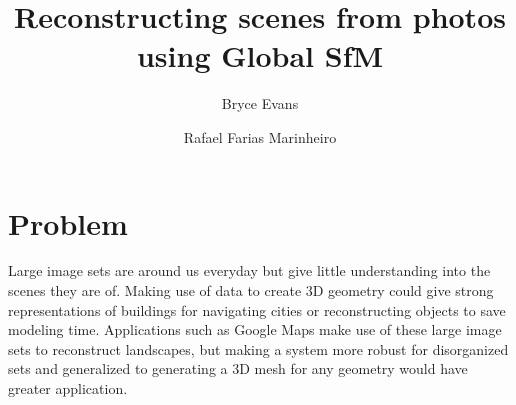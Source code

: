 \documentclass[conference, 12pt]{acmsiggraph}
\title{Reconstructing scenes from photos using Global SfM}
\author{Bryce Evans \and Rafael Farias Marinheiro}
\affiliation{Cornell University\thanks{\{bae43, rf356\}@cornell.edu}}
\begin{document}

\maketitle












\section{Problem}

Large image sets are around us everyday but give little understanding into the scenes they are of. Making use of data to create 3D geometry could give strong representations of buildings for navigating cities or reconstructing objects to save modeling time. Applications such as Google Maps make use of these large image sets to reconstruct landscapes, but making a system more robust for disorganized sets and generalized to generating a 3D mesh for any geometry would have greater application.
\end{document}
